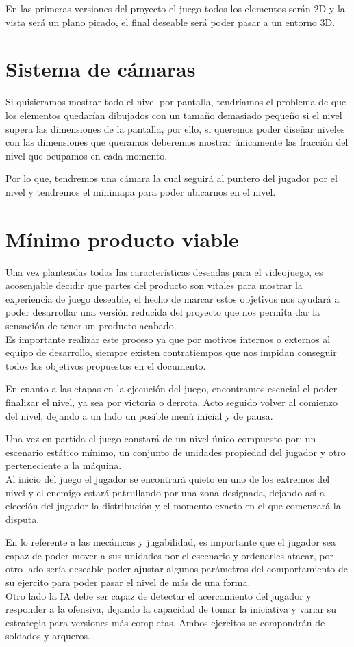 En las primeras versiones del proyecto el juego todos los elementos serán 2D y la vista será
un plano picado, el final deseable será poder pasar a un entorno 3D.

\section{Sistema de cámaras}
Si quisieramos mostrar todo el nivel por pantalla, tendríamos el problema de que los elementos
quedarían dibujados con un tamaño demasiado pequeño si el nivel supera las dimensiones de la pantalla,
por ello, si queremos poder diseñar niveles con las dimensiones que queramos deberemos mostrar únicamente
las fracción del nivel que ocupamos en cada momento.

Por lo que, tendremos una cámara la cual seguirá al puntero del jugador por el nivel y tendremos el
minimapa para poder ubicarnos en el nivel.

\section{Mínimo producto viable}
Una vez planteadas todas las características deseadas para el videojuego, es acosenjable
decidir que partes del producto son vitales para mostrar la experiencia
de juego deseable, el hecho de marcar estos objetivos nos ayudará a poder desarrollar una
versión reducida del proyecto que nos permita dar la sensación de tener un producto acabado.\\
Es importante realizar este proceso ya que por motivos internos o externos al equipo de desarrollo,
siempre existen contratiempos que nos impidan conseguir todos los objetivos propuestos en el
documento.

En cuanto a las etapas en la ejecución del juego, encontramos esencial el poder finalizar el nivel,
ya sea por victoria o derrota. Acto seguido volver al comienzo del nivel, dejando a un lado un
posible menú inicial y de pausa.

Una vez en partida el juego constará de un nivel único compuesto por: un escenario estático
mínimo, un conjunto de unidades propiedad del jugador y otro perteneciente a la máquina.\\
Al inicio del juego el jugador se encontrará quieto en uno de los extremos del nivel y el enemigo 
estará patrullando por una zona designada, dejando así a elección del jugador la distribución y el
momento exacto en el que comenzará la disputa.

En lo referente a las mecánicas y jugabilidad, es importante que el jugador sea capaz de poder
mover a sus unidades por el escenario y ordenarles atacar, por otro lado sería deseable poder
ajustar algunos parámetros del comportamiento de su ejercito para poder pasar el nivel de más
de una forma.\\
Otro lado la \ac{IA} debe ser capaz de detectar el acercamiento del jugador y responder a la
ofensiva, dejando la capacidad de tomar la iniciativa y variar su estrategia para versiones
más completas. Ambos ejercitos se compondrán de soldados y arqueros.

